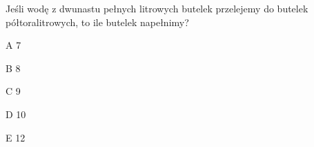 \begin{tresc}
Jeśli wodę z dwunastu pełnych litrowych butelek przelejemy do butelek półtoralitrowych, to ile butelek napełnimy?
\end{tresc}
\begin{wariant}{A} 7 \end{wariant}
\begin{wariant}{B} 8 \end{wariant}
\begin{wariant}{C} 9 \end{wariant}
\begin{wariant}{D} 10 \end{wariant}
\begin{wariant}{E} 12 \end{wariant}
